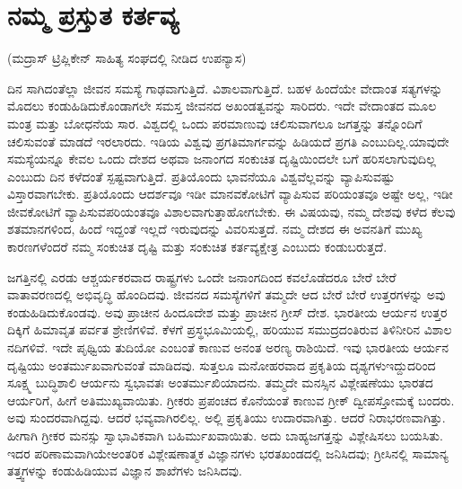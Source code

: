 
\chapter{ನಮ್ಮ ಪ್ರಸ್ತುತ ಕರ್ತವ್ಯ}

\begin{center}
(ಮದ್ರಾಸ್​ ಟ್ರಿಪ್ಲಿಕೇನ್​ ಸಾಹಿತ್ಯ ಸಂಘದಲ್ಲಿ ನೀಡಿದ ಉಪನ್ಯಾಸ)
\end{center}

ದಿನ ಸಾಗಿದಂತೆಲ್ಲಾ ಜೀವನ ಸಮಸ್ಯೆ ಗಾಢವಾಗುತ್ತಿದೆ. ವಿಶಾಲವಾಗುತ್ತಿದೆ. ಬಹಳ ಹಿಂದೆಯೇ ವೇದಾಂತ ಸತ್ಯಗಳನ್ನು ಮೊದಲು ಕಂಡುಹಿಡಿದುಕೊಂಡಾಗಲೇ ಸಮಸ್ತ ಜೀವನದ ಅಖಂಡತ್ವವನ್ನು ಸಾರಿದರು. ಇದೇ ವೇದಾಂತದ ಮೂಲ ಮಂತ್ರ ಮತ್ತು ಬೋಧನೆಯ ಸಾರ. ವಿಶ್ವದಲ್ಲಿ ಒಂದು ಪರಮಾಣುವು ಚಲಿಸುವಾಗಲೂ ಜಗತ್ತನ್ನು ತನ್ನೊಂದಿಗೆ ಚಲಿಸುವಂತೆ ಮಾಡದೆ ಇರಲಾರದು. ಇಡಿಯ ವಿಶ್ವವು ಪ್ರಗತಿಮಾರ್ಗವನ್ನು ಹಿಡಿಯದೆ ಪ್ರಗತಿ ಎಂಬುದಿಲ್ಲ.\break ಯಾವುದೇ ಸಮಸ್ಯೆಯನ್ನೂ ಕೇವಲ ಒಂದು ದೇಶದ ಅಥವಾ ಜನಾಂಗದ ಸಂಕುಚಿತ ದೃಷ್ಟಿಯಿಂದಲೇ ಬಗೆ ಹರಿಸಲಾಗುವುದಿಲ್ಲ ಎಂಬುದು ದಿನ ಕಳೆದಂತೆ ಸ್ಪಷ್ಟವಾಗುತ್ತಿದೆ. ಪ್ರತಿಯೊಂದು ಭಾವನೆಯೂ ವಿಶ್ವವೆಲ್ಲವನ್ನು ವ್ಯಾಪಿಸುವಷ್ಟು ವಿಸ್ತಾರವಾಗಬೇಕು. ಪ್ರತಿಯೊಂದು ಆದರ್ಶವೂ ಇಡೀ ಮಾನವಕೋಟಿಗೆ ವ್ಯಾಪಿಸುವ ಪರಿಯಂತವೂ ಅಷ್ಟೇ ಅಲ್ಲ, ಇಡೀ ಜೀವಕೋಟಿಗೆ ವ್ಯಾಪಿಸುವ\break ಪರಿಯಂತವೂ ವಿಶಾಲವಾಗುತ್ತಾಹೋಗಬೇಕು. ಈ ವಿಷಯವು, ನಮ್ಮ ದೇಶವು ಕಳೆದ ಕೆಲವು ಶತಮಾನಗಳಿಂದ, ಹಿಂದೆ ಇದ್ದಂತೆ ಇಲ್ಲದೆ ಇರುವುದನ್ನು ವಿವರಿಸುತ್ತದೆ. ನಮ್ಮ ದೇಶದ ಈ ಅವನತಿಗೆ ಮುಖ್ಯ ಕಾರಣಗಳೆಂದರೆ ನಮ್ಮ ಸಂಕುಚಿತ ದೃಷ್ಟಿ ಮತ್ತು ಸಂಕುಚಿತ ಕರ್ತವ್ಯಕ್ಷೇತ್ರ ಎಂಬುದು ಕಂಡುಬರುತ್ತದೆ.

ಜಗತ್ತಿನಲ್ಲಿ ಎರಡು ಆಶ್ಚರ್ಯಕರವಾದ ರಾಷ್ಟ್ರಗಳು ಒಂದೇ ಜನಾಂಗದಿಂದ ಕವಲೊಡೆದರೂ ಬೇರೆ ಬೇರೆ ವಾತಾವರಣದಲ್ಲಿ ಅಭಿವೃದ್ಧಿ ಹೊಂದಿದವು. ಜೀವನದ ಸಮಸ್ಯೆಗಳಿಗೆ ತಮ್ಮದೇ ಆದ ಬೇರೆ ಬೇರೆ ಉತ್ತರಗಳನ್ನು ಅವು ಕಂಡುಹಿಡಿದುಕೊಂಡವು. ಅವು ಪ್ರಾಚೀನ ಹಿಂದೂದೇಶ ಮತ್ತು ಪ್ರಾಚೀನ ಗ್ರೀಸ್​ ದೇಶ. ಭಾರತೀಯ ಆರ್ಯನ ಉತ್ತರ ದಿಕ್ಕಿಗೆ ಹಿಮಾವೃತ ಪರ್ವತ ಶ್ರೇಣಿಗಳಿವೆ. ಕೆಳಗೆ ಪ್ರಸ್ಥಭೂಮಿಯಲ್ಲಿ, ಹರಿಯುವ ಸಮುದ್ರದಂತಿರುವ ತಿಳಿನೀರಿನ ವಿಶಾಲ ನದಿಗಳಿವೆ. ಇದೇ ಪೃಥ್ವಿಯ ತುದಿಯೋ ಎಂಬಂತೆ ಕಾಣುವ ಅನಂತ ಅರಣ್ಯ ರಾಶಿಯಿದೆ. ಇವು ಭಾರತೀಯ ಆರ್ಯನ ದೃಷ್ಟಿಯು ಅಂತರ್ಮುಖವಾಗುವಂತೆ ಮಾಡಿದವು. ಸುತ್ತಲೂ ಮನೋಹರವಾದ ಪ್ರಕೃತಿಯ ದೃಶ್ಯಗಳು\break ಇದ್ದುದರಿಂದ ಸೂಕ್ಷ್ಮ ಬುದ್ಧಿಶಾಲಿ ಆರ್ಯನು ಸ್ವಭಾವತಃ ಅಂತರ್ಮುಖಿಯಾದನು. ತಮ್ಮದೇ ಮನಸ್ಸಿನ ವಿಶ್ಲೇಷಣೆಯು ಭಾರತದ ಆರ್ಯರಿಗೆ, ಹೀಗೆ ಅತಿಮುಖ್ಯವಾಯಿತು. ಗ್ರೀಕರು ಪ್ರಪಂಚದ ಕೊನೆಯಂತೆ ಕಾಣುವ ಗ್ರೀಕ್​ ದ್ವೀಪಸ್ತೋಮಕ್ಕೆ ಬಂದರು. ಅವು ಸುಂದರವಾಗಿದ್ದವು. ಆದರೆ ಭವ್ಯವಾಗಿರ\-ಲಿಲ್ಲ. ಅಲ್ಲಿ ಪ್ರಕೃತಿಯು ಉದಾರವಾಗಿತ್ತು. ಆದರೆ ನಿರಾಭರಣವಾಗಿತ್ತು. ಹೀಗಾಗಿ ಗ್ರೀಕರ ಮನಸ್ಸು ಸ್ವಾಭಾವಿಕವಾಗಿ ಬಹಿರ್ಮುಖವಾಯಿತು. ಅದು ಬಾಹ್ಯಜಗತ್ತನ್ನು ವಿಶ್ಲೇಷಿಸಲು ಬಯಸಿತು. ಇದರ ಪರಿಣಾಮವಾಗಿಯೇ\break ಅಂತರಿಕ ವಿಶ್ಲೇಷಣಾತ್ಮಕ ವಿಜ್ಞಾನಗಳು  ಭರತಖಂಡದಲ್ಲಿ ಜನಿಸಿದವು; ಗ್ರೀಸಿನಲ್ಲಿ ಸಾಮಾನ್ಯ ತತ್ತ್ವಗಳನ್ನು ಕಂಡುಹಿಡಿಯುವ ವಿಜ್ಞಾನ ಶಾಖೆಗಳು  ಜನಿಸಿದವು.

